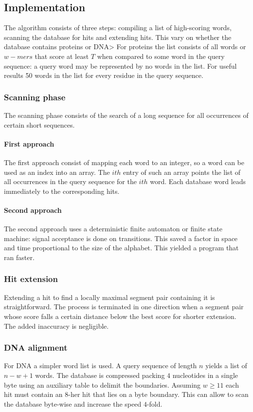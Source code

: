 	\subsection{Implementation}
	The algorithm consists of three steps: compiling a list of high-scoring words, scanning the database for hits and extending hits.
	This vary on whether the database contains proteins or DNA>
	For proteins the list consists of all words or $w-mers$ that score at least $T$ when compared to some word in the query sequence: a query word may be represented by no words in the list.
	For useful results 50 words in the list for every residue in the query sequence.

		\subsubsection{Scanning phase}
		The scanning phase consists of the search of a long sequence for all occurrences of certain short sequences.

			\paragraph{First approach}
			The first approach consist of mapping each word to an integer, so a word can be used as an index into an array.
			The $ith$ entry of such an array points the list of all occurrences in the query sequence for the $ith$ word.
			Each database word leads immediately to the corresponding hits.

			\paragraph{Second approach}
			The second approach uses a deterministic finite automaton or finite state machine: signal acceptance is done on transitions.
			This saved a factor in space and time proportional to the size of the alphabet.
			This yielded a program that ran faster.

		\subsubsection{Hit extension}
		Extending a hit to find a locally maximal segment pair containing it is straightforward.
		The process is terminated in one direction when a segment pair whose score falls a certain distance below the best score for shorter extension.
		The added inaccuracy is negligible.

		\subsubsection{DNA alignment}
		For DNA a simpler word list is used.
		A query sequence of length $n$ yields a list of $n-w+1$ words.
		The database is compressed packing $4$ nucleotides in a single byte using an auxiliary table to delimit the boundaries.
		Assuming $w\ge 11$ each hit must contain an $8$-her hit that lies on a byte boundary.
		This can allow to scan the database byte-wise and increase the speed $4$-fold.

